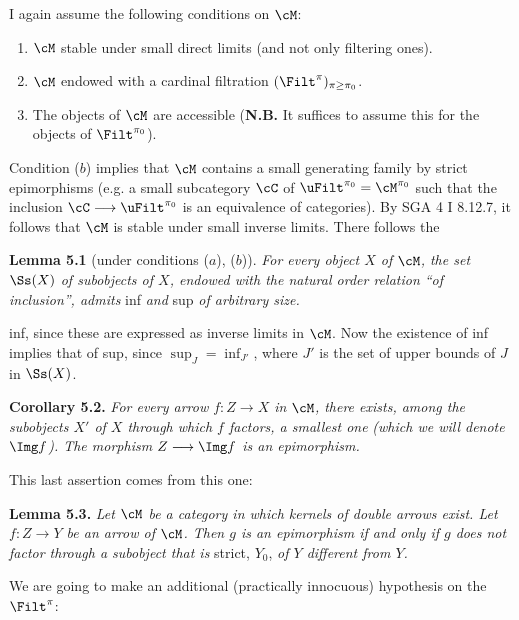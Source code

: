
I again assume the following conditions on $\cM$:

\begin{enumerate}[nosep]
\item[\textit{a})] $\cM$ stable under small direct limits (and not only filtering ones).
\item[\textit{b})] $\cM$ endowed with a cardinal filtration $(\Filt^{\pi})_{\pi\geq\pi_0}$.
\item[\textit{c})] The objects of $\cM$ are accessible (\textbf{N.B.} It suffices to assume this for the objects of $\Filt^{\pi_0}$).
\end{enumerate}

Condition ($b$) implies that $\cM$ contains a small generating family by strict epimorphisms (e.g. a small subcategory $\cC$ of $\uFilt^{\pi_0} = \cM^{\pi_0}$ such that the inclusion $\cC \longrightarrow \uFilt^{\pi_0}$ is an equivalence of categories). By SGA 4 I 8.12.7, it follows that $\cM$ is stable under small inverse limits. There follows the

\textbf{Lemma 5.1} (under conditions ($a$), ($b$)). \textit{For every object $X$ of $\cM$, the set} $\Ss(X)$ \textit{of subobjects of $X$, endowed with the natural order relation ``of inclusion'', admits} inf \textit{and} sup \textit{of arbitrary size.}

inf, since these are expressed as inverse limits in $\cM$. Now the existence of inf implies that of sup, since $\sup_J = \inf_{J'}$, where $J'$ is the set of upper bounds of $J$ in $\Ss(X)$.

\textbf{Corollary 5.2.} \textit{For every arrow $f : Z \longrightarrow X$ in $\cM$, there exists, among the subobjects $X'$ of $X$ through which $f$ factors, a smallest one} %
\textit{(which we will denote} $\Img f$\textit{). The morphism $Z \longrightarrow \Img f$ is an epimorphism.}

This last assertion comes from this one:

\textbf{Lemma 5.3.} \textit{Let $\cM$ be a category in which kernels of double arrows exist. Let $f : Z \longrightarrow Y$ be an arrow of $\cM$. Then $g$ is an epimorphism if and only if $g$ does not factor through a subobject that is} strict, $Y_0$, \textit{of $Y$ different from $Y$.} %

We are going to make an additional (practically innocuous) hypothesis on the $\Filt^{\pi}$:


